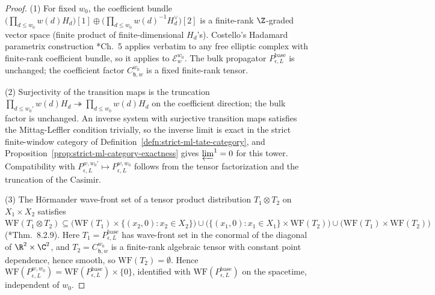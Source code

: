 \begin{proof}
  (1) For fixed $w_0$, the coefficient bundle
  $\bigl(\prod_{d\leq w_0}w(d)H_d\bigr)[1]\oplus
  \bigl(\prod_{d\leq w_0}w(d)^{-1}H_d^\vee\bigr)[2]$ is a finite-rank
  $\Z$-graded vector space (finite product of finite-dimensional
  $H_d$'s). Costello's Hadamard parametrix construction
  \cite{costello-renormalization}*{Ch.~5} applies verbatim to any free
  elliptic complex with finite-rank coefficient bundle, so it applies
  to $\mathcal E_w^{w_0}$. The bulk propagator
  $P_{\epsilon,L}^{\mathrm{base}}$ is unchanged; the coefficient
  factor $C_{\mathfrak h,w}^{w_0}$ is a fixed finite-rank tensor.

  (2) Surjectivity of the transition maps is the truncation
  $\prod_{d\leq w_0'}w(d)H_d\twoheadrightarrow\prod_{d\leq w_0}w(d)H_d$
  on the coefficient direction; the bulk factor is unchanged. An
  inverse system with surjective transition maps satisfies the
  Mittag-Leffler condition trivially, so the inverse limit is exact in
  the strict finite-window category of
  Definition~\ref{defn:strict-ml-tate-category}, and
  Proposition~\ref{prop:strict-ml-category-exactness} gives
  \(\varprojlim^1=0\) for this tower. Compatibility with
  $P_{\epsilon,L}^{w,w_0'}\mapsto P_{\epsilon,L}^{w,w_0}$ follows from
  the tensor factorization and the truncation of the Casimir.

  (3) The Hörmander wave-front set of a tensor product distribution
  $T_1\otimes T_2$ on $X_1\times X_2$ satisfies
  $\mathrm{WF}(T_1\otimes T_2)\subseteq\bigl(\mathrm{WF}(T_1)\times
  \{(x_2,0):x_2\in X_2\}\bigr)\cup\bigl(\{(x_1,0):x_1\in X_1\}\times
  \mathrm{WF}(T_2)\bigr)\cup\bigl(\mathrm{WF}(T_1)\times
  \mathrm{WF}(T_2)\bigr)$ (\cite{hormander-vol1}*{Thm.~8.2.9}). Here
  $T_1=P_{\epsilon,L}^{\mathrm{base}}$ has wave-front set in the
  conormal of the diagonal of $\R^2\times\C^2$, and
  $T_2=C_{\mathfrak h,w}^{w_0}$ is a finite-rank algebraic tensor
  with constant point dependence, hence smooth, so
  $\mathrm{WF}(T_2)=\emptyset$. Hence
  $\mathrm{WF}(P_{\epsilon,L}^{w,w_0})=
  \mathrm{WF}(P_{\epsilon,L}^{\mathrm{base}})\times\{0\}$, identified
  with $\mathrm{WF}(P_{\epsilon,L}^{\mathrm{base}})$ on the
  spacetime, independent of $w_0$.
\end{proof}

